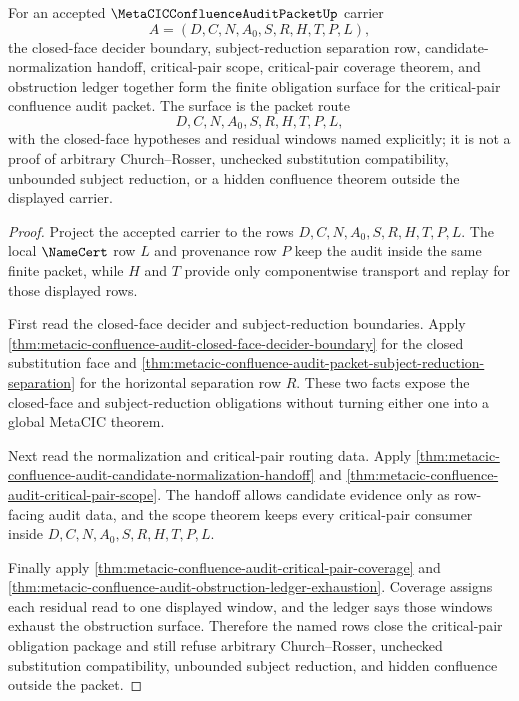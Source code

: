 \begin{theorem}
\label{thm:metacic-confluence-audit-critical-pair-obligation-closure}
For an accepted $\MetaCICConfluenceAuditPacketUp$ carrier
$$
A=(D,C,N,A_0,S,R,H,T,P,L),
$$
the closed-face decider boundary, subject-reduction separation row, candidate-normalization handoff, critical-pair scope, critical-pair coverage theorem, and obstruction ledger together form the finite obligation surface for the critical-pair confluence audit packet. The surface is the packet route
$$
D,C,N,A_0,S,R,H,T,P,L,
$$
with the closed-face hypotheses and residual windows named explicitly; it is not a proof of arbitrary Church--Rosser, unchecked substitution compatibility, unbounded subject reduction, or a hidden confluence theorem outside the displayed carrier.
\end{theorem}
\begin{proof}
Project the accepted carrier to the rows $D,C,N,A_0,S,R,H,T,P,L$. The local $\NameCert$ row $L$ and provenance row $P$ keep the audit inside the same finite packet, while $H$ and $T$ provide only componentwise transport and replay for those displayed rows.

First read the closed-face decider and subject-reduction boundaries. Apply \autoref{thm:metacic-confluence-audit-closed-face-decider-boundary} for the closed substitution face and \autoref{thm:metacic-confluence-audit-packet-subject-reduction-separation} for the horizontal separation row $R$. These two facts expose the closed-face and subject-reduction obligations without turning either one into a global MetaCIC theorem.

Next read the normalization and critical-pair routing data. Apply \autoref{thm:metacic-confluence-audit-candidate-normalization-handoff} and \autoref{thm:metacic-confluence-audit-critical-pair-scope}. The handoff allows candidate evidence only as row-facing audit data, and the scope theorem keeps every critical-pair consumer inside $D,C,N,A_0,S,R,H,T,P,L$.

Finally apply \autoref{thm:metacic-confluence-audit-critical-pair-coverage} and \autoref{thm:metacic-confluence-audit-obstruction-ledger-exhaustion}. Coverage assigns each residual read to one displayed window, and the ledger says those windows exhaust the obstruction surface. Therefore the named rows close the critical-pair obligation package and still refuse arbitrary Church--Rosser, unchecked substitution compatibility, unbounded subject reduction, and hidden confluence outside the packet.
\end{proof}

